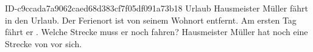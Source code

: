 \begin{exercise}
      {ID-c9ccada7a9062caed68d383cf7f05df091a73b18}
      {Urlaub}
  \ifproblem\problem
    Hausmeister Müller fährt in den Urlaub. Der Ferienort ist  von seinem
    Wohnort entfernt. Am ersten Tag fährt er . Welche Strecke muss er noch
    fahren?
  \fi
  \ifoutcome\outcome
    Hausmeister Müller hat noch eine Strecke von  vor sich.
  \fi
\end{exercise}
